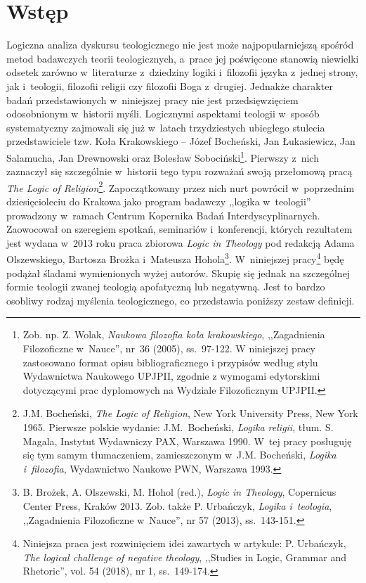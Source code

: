 \chapter*{Wstęp}

Logiczna analiza dyskursu teologicznego nie jest może najpopularniejszą spośród metod badawczych teorii teologicznych, a~prace jej poświęcone stanowią niewielki odsetek zarówno w~literaturze z~dziedziny logiki i~filozofii języka z~jednej strony, jak i~teologii, filozofii religii czy filozofii Boga z~drugiej. Jednakże charakter badań przedstawionych w~niniejszej pracy nie jest przedsięwzięciem odosobnionym w~historii myśli. Logicznymi aspektami teologii w~sposób systematyczny zajmowali się już w~latach trzydziestych ubiegłego stulecia przedstawiciele tzw. Koła Krakowskiego -- Józef Bocheński, Jan Łukasiewicz, Jan Salamucha, Jan Drewnowski oraz Bolesław Sobociński\footnote{Zob. np. Z. Wolak, \textit{Naukowa filozofia koła krakowskiego}, ,,Zagadnienia Filozoficzne w~Nauce'', nr~36 (2005), ss.~97-122.
W niniejszej pracy zastosowano format opisu bibliograficznego i przypisów  według stylu Wydawnictwa Naukowego UPJPII, zgodnie z wymogami edytorskimi dotyczącymi prac dyplomowych na Wydziale Filozoficznym UPJPII.
}.
Pierwszy z~nich zaznaczył się szczególnie w~historii tego typu rozważań swoją przełomową pracą \textit{The Logic of Religion}\footnote{J.M. Bocheński, \textit{The Logic of Religion}, New York University Press, New York 1965. Pierwsze polskie wydanie: J.M.~Bocheński, \textit{Logika religii}, tłum. S. Magala, Instytut Wydawniczy PAX, Warszawa 1990. W~tej pracy posługuję się tym samym tłumaczeniem, zamieszczonym w~J.M. Bocheński, \textit{Logika i~filozofia}, Wydawnictwo Naukowe PWN, Warszawa 1993.}.
Zapoczątkowany przez nich nurt powrócił w~poprzednim dziesięcioleciu do Krakowa jako program badawczy ,,logika w~teologii'' prowadzony w~ramach Centrum Kopernika Badań Interdyscyplinarnych. Zaowocował on szeregiem spotkań, seminariów i~konferencji, których rezultatem jest wydana w~2013 roku praca zbiorowa \textit{Logic in Theology} pod redakcją Adama Olszewskiego, Bartosza Brożka i~Mateusza Hohola\footnote{B. Brożek, A. Olszewski, M. Hohol (red.), \textit{Logic in Theology}, Copernicus Center Press, Kraków 2013. Zob. także P. Urbańczyk, \textit{Logika i~teologia}, ,,Zagadnienia Filozoficzne w~Nauce'', nr 57 (2013), ss.~143-151.}. W~niniejszej pracy\footnote{Niniejsza praca jest
rozwinięciem idei zawartych w artykule: P. Urbańczyk, \textit{The logical challenge of negative theology}, ,,Studies in Logic, Grammar and Rhetoric'', vol. 54 (2018), nr 1, ss.~149-174.} będę podążał śladami wymienionych wyżej autorów. Skupię się jednak na szczególnej formie teologii zwanej teologią apofatyczną lub negatywną. Jest to bardzo osobliwy rodzaj myślenia teologicznego, co przedstawia poniższy zestaw definicji.


